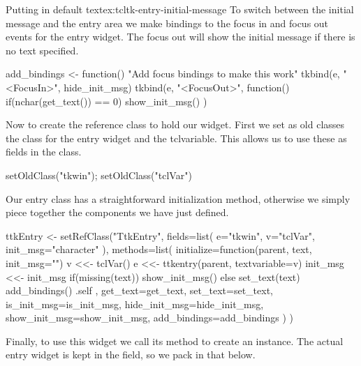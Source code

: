 \begin{example}{Putting in default text}{ex:tcltk-entry-initial-message}
To switch between the initial message and the entry area we make
bindings to the focus in and focus out events for the entry
widget. The focus out will show the initial message if there is no
text specified.

\begin{Schunk}
\begin{Sinput}
 add_bindings <- function() {
   "Add focus bindings to make this work"
   tkbind(e, "<FocusIn>", hide_init_msg)
   tkbind(e, "<FocusOut>", function() {
     if(nchar(get_text()) == 0)
       show_init_msg()
   })
 }
\end{Sinput}
\end{Schunk}

Now to create the reference class to hold our widget. First we set as old
classes the class for the entry widget and the tclvariable. This
allows us to use these as fields in the class.
\begin{Schunk}
\begin{Sinput}
 setOldClass("tkwin"); setOldClass("tclVar")
\end{Sinput}
\end{Schunk}
%
Our entry class has a straightforward initialization method, otherwise
we simply piece together the components we have just defined.
\begin{Schunk}
\begin{Sinput}
 ttkEntry <- 
   setRefClass("TtkEntry",
         fields=list(
           e="tkwin", v="tclVar",
           init_msg="character"
           ),
         methods=list(
           initialize=function(parent, text, init_msg="") {
             v <<- tclVar()
             e <<- ttkentry(parent, textvariable=v)
             init_msg <<- init_msg
             if(missing(text))
               show_init_msg()
             else
               set_text(text)
             add_bindings()
             .self
           },
           get_text=get_text,
           set_text=set_text,
           is_init_msg=is_init_msg,
           hide_init_msg=hide_init_msg,
           show_init_msg=show_init_msg,
           add_bindings=add_bindings
           )
         )
\end{Sinput}
\end{Schunk}

Finally, to use this widget we call its  method to create an
instance. The actual entry widget is kept in the  field, so we
pack in that below.
\begin{Schunk}
\end{Schunk}

\end{example}


